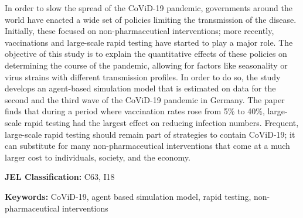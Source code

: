\noindent
% 
In order to slow the spread of the CoViD-19 pandemic, governments around the world have
enacted a wide set of policies limiting the transmission of the disease. Initially,
these focused on non-pharmaceutical interventions; more recently, vaccinations and
large-scale rapid testing have started to play a major role. The objective of this study
is to explain the quantitative effects of these policies on determining the course of
the pandemic, allowing for factors like seasonality or virus strains with different
transmission profiles. In order to do so, the study develops an agent-based simulation
model that is estimated on data for the second and the third wave of the CoViD-19
pandemic in Germany. The paper finds that during a period where vaccination rates rose
from 5\% to 40\%, large-scale rapid testing had the largest effect on reducing infection
numbers. 
Frequent, large-scale rapid testing should remain part of strategies to contain
CoViD-19; it can substitute for many non-pharmaceutical interventions that come at a
much larger cost to individuals, society, and the economy.


\vspace{1cm}
\noindent \textbf{JEL Classification:} C63, I18

\noindent \textbf{Keywords:} CoViD-19, agent based simulation model, rapid testing,
non-pharmaceutical interventions